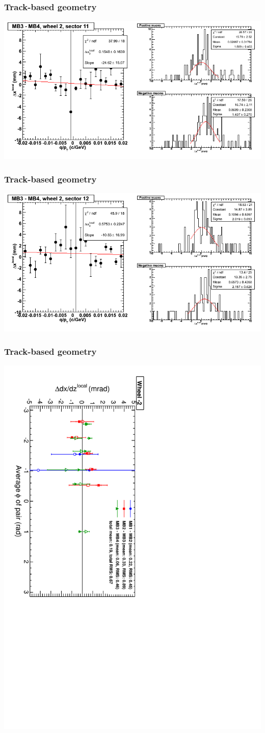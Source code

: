 \documentclass[compress]{beamer}
\begin{document}
\begin{frame}
\frametitle{Track-based geometry}
\includegraphics[width=\linewidth]{NOV4_segdiffs/dt13_resid_E_11_34.png}
\end{frame}

\begin{frame}
\frametitle{Track-based geometry}
\includegraphics[width=\linewidth]{NOV4_segdiffs/dt13_resid_E_12_34.png}
\end{frame}

\begin{frame}
\frametitle{Track-based geometry}
\includegraphics[height=\linewidth, angle=90]{NOV4_segdiff_dxdz_whm2.pdf}
\end{frame}
\end{document}
